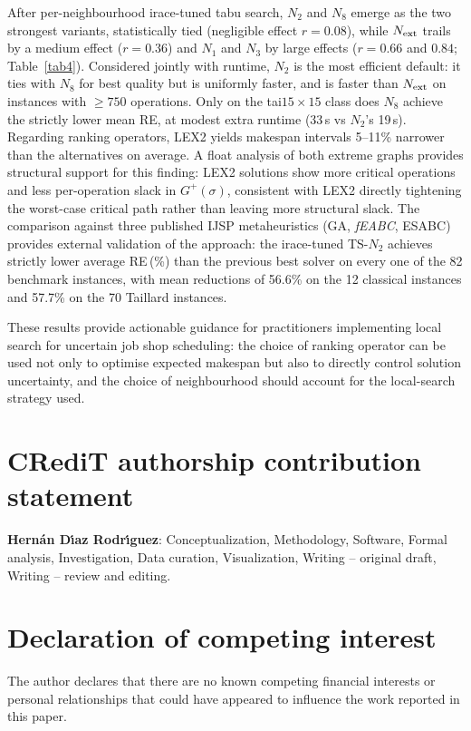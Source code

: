 \documentclass[preprint,12pt]{elsarticle}
\begin{document}
After per-neighbourhood irace-tuned tabu search, $N_2$ and $N_8$ emerge as the two strongest variants, statistically tied (negligible effect $r=0.08$), while $N_{\rm ext}$ trails by a medium effect ($r=0.36$) and $N_1$ and $N_3$ by large effects ($r=0.66$ and $0.84$; Table~\ref{tab4}). Considered jointly with runtime, $N_2$ is the most efficient default: it ties with $N_8$ for best quality but is uniformly faster, and is faster than $N_{\rm ext}$ on instances with $\geq 750$ operations. Only on the tai$15{\times}15$ class does $N_8$ achieve the strictly lower mean RE, at modest extra runtime (33\,s vs $N_2$'s 19\,s). Regarding ranking operators, LEX2 yields makespan intervals 5--11\% narrower than the alternatives on average. A float analysis of both extreme graphs provides structural support for this finding: LEX2 solutions show more critical operations and less per-operation slack in $G^+(\sigma)$, consistent with LEX2 directly tightening the worst-case critical path rather than leaving more structural slack. The comparison against three published IJSP metaheuristics (GA, \emph{fEABC}, ESABC) provides external validation of the approach: the irace-tuned TS-$N_2$ achieves strictly lower average RE\,(\%) than the previous best solver on every one of the 82 benchmark instances, with mean reductions of 56.6\% on the 12 classical instances and 57.7\% on the 70 Taillard instances.

These results provide actionable guidance for practitioners implementing local search for uncertain job shop scheduling: the choice of ranking operator can be used not only to optimise expected makespan but also to directly control solution uncertainty, and the choice of neighbourhood should account for the local-search strategy used.


\section*{CRediT authorship contribution statement}

\textbf{Hern\'an D\'{\i}az Rodr\'{\i}guez}: Conceptualization, Methodology, Software, Formal analysis, Investigation, Data curation, Visualization, Writing -- original draft, Writing -- review and editing.


\section*{Declaration of competing interest}

The author declares that there are no known competing financial interests or personal relationships that could have appeared to influence the work reported in this paper.
\end{document}

